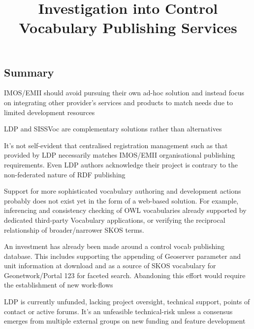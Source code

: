 \documentclass[10pt,a4paper]{article}
\title{Investigation into Control Vocabulary Publishing Services}
\date{}
\newenvironment{italicquotes}
{\begin{quote}\itshape}
{\end{quote}}
\let\Item\item
\newcommand\SpecialItem{\renewcommand\item[1][]{\Item[\textbullet~\bfseries##1]}}
\begin{document}
\SpecialItem

  \maketitle
    \begin{flushleft}



% 
% 



\section{
	Summary
}

\item[] IMOS/EMII should avoid pursuing their own ad-hoc solution and instead focus on integrating other provider's services and products to match needs due to limited development resources
\item[] LDP and SISSVoc are complementary solutions rather than alternatives
\item[] It's not self-evident that centralised registration management such as that provided by LDP necessarily matches IMOS/EMII organisational publishing requirements. Even LDP authors acknowledge their project is contrary to the non-federated nature of RDF publishing
\item[] Support for more sophisticated vocabulary authoring and development actions probably does not exist yet in the form of a web-based solution. For example, inferencing and consistency checking of OWL vocabularies already supported by dedicated third-party Vocabulary applications, or verifying the reciprocal relationship of broader/narrower SKOS terms.
\item[] An investment has already been made around a control vocab publishing database. This includes supporting the appending of Geoserver parameter and unit information at download and 
as a source of SKOS vocabulary for Geonetwork/Portal 123 for faceted search. Abandoning this effort would require the establishment of new work-flows
\item[] LDP is currently unfunded, lacking project oversight, technical support, points of contact or active forums. It's an unfeasible technical-risk unless a consensus emerges from multiple external groups on new funding and feature development 



\end{flushleft}
\end{document}
